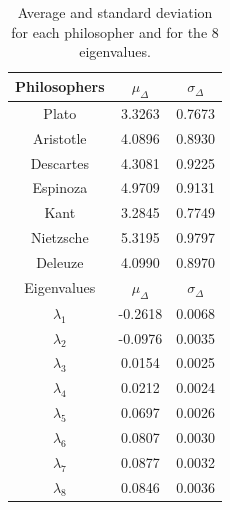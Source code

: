 \documentclass[
 aip,
 jmp,
 amsmath,amssymb,
 reprint,
]{revtex4-1}
\begin{document}
\begin{table}
  \caption{\label{tab:tableDphi}Average and standard deviation for
    each philosopher and for the 8 eigenvalues.  }
  \begin{tabular}{|c||c|c|}
    \hline
    Philosophers & $\mu_{\Delta}$ & $\sigma_{\Delta}$ \\
    \hline
    Plato          & 3.3263 & 0.7673 \\
    Aristotle      & 4.0896 & 0.8930 \\
    Descartes      & 4.3081 & 0.9225 \\
    Espinoza       & 4.9709 & 0.9131 \\
    Kant           & 3.2845 & 0.7749 \\
    Nietzsche      & 5.3195 & 0.9797 \\
    Deleuze        & 4.0990 & 0.8970 \\
    \hline \hline
    Eigenvalues & $\mu_{\Delta}$ & $\sigma_{\Delta}$ \\
    \hline
    $\lambda_1$ & -0.2618 & 0.0068 \\
    $\lambda_2$ & -0.0976 & 0.0035 \\
    $\lambda_3$ &  0.0154 & 0.0025 \\
    $\lambda_4$ &  0.0212 & 0.0024 \\
    $\lambda_5$ &  0.0697 & 0.0026 \\
    $\lambda_6$ &  0.0807 & 0.0030 \\
    $\lambda_7$ &  0.0877 & 0.0032 \\
    $\lambda_8$ &  0.0846 & 0.0036 \\
    \hline
  \end{tabular}
\end{table}

\nocite{*}

\end{document}
